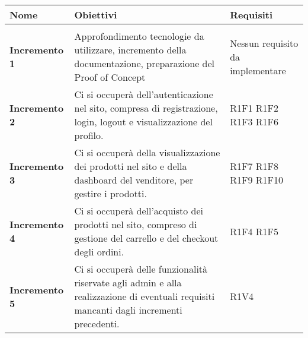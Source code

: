{


\centering
\renewcommand{\arraystretch}{1.8}
\begin{longtable}{C{3cm} C{8cm} C{3cm} }

\textbf{Nome} &
\textbf{Obiettivi}&
\textbf{Requisiti}\\
\endhead

\\
\textbf{Incremento 1} & Approfondimento tecnologie da utilizzare, incremento della documentazione, preparazione del Proof of Concept & Nessun requisito da implementare \\
\textbf{Incremento 2} & Ci si occuperà dell'autenticazione nel sito, compresa di registrazione, login, logout e visualizzazione del profilo. & R1F1 \newline R1F2 \newline R1F3 \newline R1F6 \\
\textbf{Incremento 3} & Ci si occuperà della visualizzazione dei prodotti nel sito e della dashboard del venditore, per gestire i prodotti. & R1F7 \newline R1F8 \newline R1F9 \newline R1F10 \\
\textbf{Incremento 4} & Ci si occuperà dell'acquisto dei prodotti nel sito, compreso di gestione del carrello e del checkout degli ordini. & R1F4 \newline R1F5 \\
\textbf{Incremento 5} & Ci si occuperà delle funzionalità riservate agli admin e alla realizzazione di eventuali requisiti mancanti dagli incrementi precedenti. & R1V4 \\


\end{longtable}}

